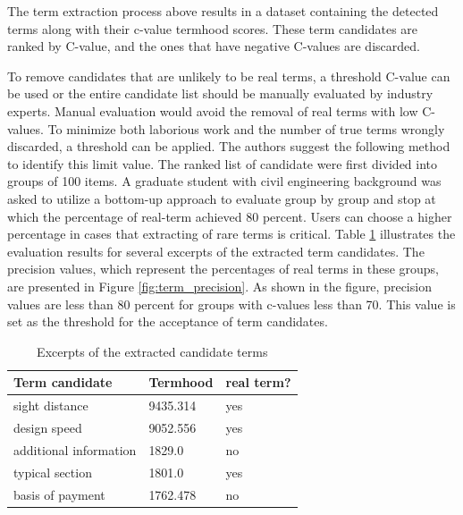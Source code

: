 \documentclass[Journal,InsideFigs, DoubleSpace]{ascelike} %
\begin{document}
%
\par
The term extraction process above results in a dataset containing the detected terms along with their c-value termhood scores. These term candidates are ranked by C-value, and the ones that have negative C-values are discarded. %
\par
To remove candidates that are unlikely to be real terms, a threshold C-value can be used or the entire candidate list should be manually evaluated by industry experts. Manual evaluation would avoid the removal of real terms with low C-values. To minimize both laborious work and the number of true terms wrongly discarded, a threshold can be applied. The authors suggest the following method to identify this limit value. The ranked list of candidate were first divided into groups of 100 items. A graduate student with civil engineering background was asked to utilize a bottom-up approach to evaluate group by group and stop at which the percentage of real-term achieved 80 percent. Users can choose a higher percentage in cases that extracting of rare terms is critical. Table \ref{table:term_evaluation} illustrates the evaluation results for several excerpts of the extracted term candidates. The precision values, which represent the percentages of real terms in these groups, are presented in Figure \ref{fig:term_precision}. As shown in the figure, precision values are less than 80 percent for groups with c-values less than 70. This value is set as the threshold for the acceptance of term candidates.
%
\begin{table} [t]
	\caption{Excerpts of the extracted candidate terms}
	\label{table:term_evaluation}
	\centering
	\small
	\renewcommand{\arraystretch}{1.25}
	\begin{tabular}{l l l}
		\hline
		\textbf{Term candidate} & \textbf{Termhood} & \textbf{real term?}\\
		\hline
		sight distance		& 9435.314 & yes\\
		design speed & 9052.556 & yes \\
		additional information & 1829.0 & no\\
		typical section & 1801.0  & yes\\
		basis of payment & 1762.478 & no\\
		\hline
	\end{tabular}
	
	\normalsize
\end{table}
\end{document}
